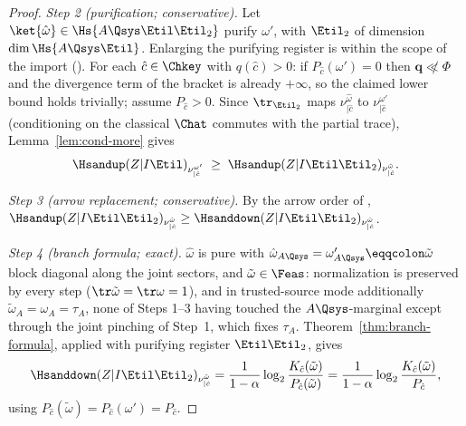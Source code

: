 \begin{proof}
\emph{Step 2 (purification; conservative).} Let
$\ket{\hat\omega}\in\Hs{A\Qsys\Etil\Etil_2}$ purify $\omega'$, with
$\Etil_2$ of dimension $\dim\Hs{A\Qsys\Etil}$. Enlarging the purifying
register is within the scope of the import
(\cite[footnote~17]{arqand2025meat}).
For each $\hat c\in\Chkey$ with $q(\hat c)>0$: if $P_{\hat c}(\omega')=0$
then $\mathbf q\not\ll\Phi$ and the divergence term of the bracket is
already $+\infty$, so the claimed lower bound holds trivially; assume
$P_{\hat c}>0$. Since
$\tr_{\Etil_2}$ maps $\nu^{\hat\omega}_{|\hat c}$ to
$\nu^{\omega'}_{|\hat c}$ (conditioning on the classical $\Chat$ commutes
with the partial trace), Lemma~\ref{lem:cond-more} gives
\begin{equation*}
  \Hsandup(Z|I\Etil)_{\nu^{\omega'}_{|\hat c}}
  \;\ge\;\Hsandup(Z|I\Etil\Etil_2)_{\nu^{\hat\omega}_{|\hat c}}.
\end{equation*}

\emph{Step 3 (arrow replacement; conservative).} By the arrow order of
,
$\Hsandup(Z|I\Etil\Etil_2)_{\nu^{\hat\omega}_{|\hat c}}
\ge\Hsanddown(Z|I\Etil\Etil_2)_{\nu^{\hat\omega}_{|\hat c}}$.

\emph{Step 4 (branch formula; exact).} $\hat\omega$ is pure with
$\hat\omega_{A\Qsys}=\omega'_{A\Qsys}\eqqcolon\tilde\omega$
block diagonal along the joint sectors, and $\tilde\omega\in\Feas$: normalization is
preserved by every step ($\tr\tilde\omega=\tr\omega=1$), and in
trusted-source mode additionally
$\tilde\omega_A=\omega_A=\tau_A$, none of Steps 1--3 having touched the
$A\Qsys$-marginal except through the joint pinching of Step~1, which
fixes $\tau_A$. Theorem~\ref{thm:branch-formula}, applied with
purifying register $\Etil\Etil_2$, gives
\begin{equation*}
  \Hsanddown(Z|I\Etil\Etil_2)_{\nu^{\hat\omega}_{|\hat c}}
  =\frac{1}{1-\alpha}\log_2
  \frac{K_{\hat c}(\tilde\omega)}{P_{\hat c}(\tilde\omega)}
  =\frac{1}{1-\alpha}\log_2\frac{K_{\hat c}(\tilde\omega)}{P_{\hat c}},
\end{equation*}
using $P_{\hat c}(\tilde\omega)=P_{\hat c}(\omega')=P_{\hat c}$.


\end{proof}
